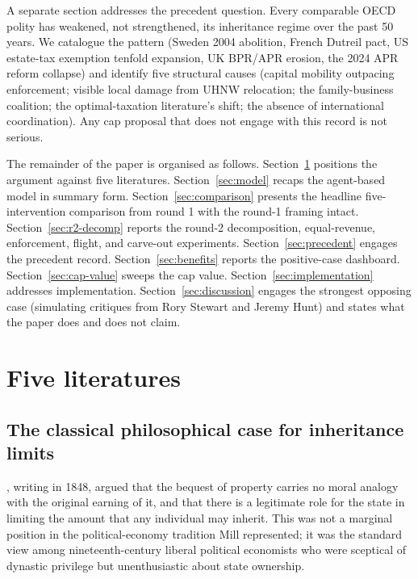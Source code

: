 \documentclass[11pt]{article}
\begin{document}
A separate section addresses the precedent question.  Every
comparable OECD polity has weakened, not strengthened, its
inheritance regime over the past 50 years.  We catalogue the pattern
(Sweden 2004 abolition, French Dutreil pact, US estate-tax
exemption tenfold expansion, UK BPR/APR erosion, the 2024 APR
reform collapse) and identify five structural causes (capital
mobility outpacing enforcement; visible local damage from UHNW
relocation; the family-business coalition; the optimal-taxation
literature's shift; the absence of international coordination).
Any cap proposal that does not engage with this record is not
serious.

The remainder of the paper is organised as follows.
Section~\ref{sec:literature} positions the argument against five
literatures.  Section~\ref{sec:model} recaps the agent-based
model in summary form.
Section~\ref{sec:comparison} presents the headline five-intervention
comparison from round 1 with the round-1 framing intact.
Section~\ref{sec:r2-decomp} reports the round-2 decomposition,
equal-revenue, enforcement, flight, and carve-out experiments.
Section~\ref{sec:precedent} engages the precedent record.
Section~\ref{sec:benefits} reports the positive-case dashboard.
Section~\ref{sec:cap-value} sweeps the cap value.
Section~\ref{sec:implementation} addresses implementation.
Section~\ref{sec:discussion} engages the strongest opposing case
(simulating critiques from Rory Stewart and Jeremy Hunt) and
states what the paper does and does not claim.

\section{Five literatures}
\label{sec:literature}

\subsection{The classical philosophical case for inheritance limits}

\citet{mill1848principles}, writing in 1848, argued that the bequest
of property carries no moral analogy with the original earning of it,
and that there is a legitimate role for the state in limiting the
amount that any individual may inherit.  This was not a marginal
position in the political-economy tradition Mill represented; it was
the standard view among nineteenth-century liberal political
economists who were sceptical of dynastic privilege but
unenthusiastic about state ownership.
\end{document}
